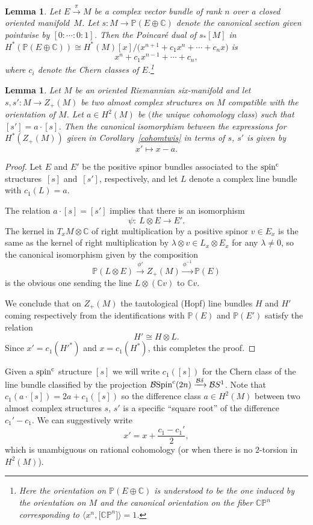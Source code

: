 \documentclass[10pt,a4paper]{amsart}
\newcommand{\CP}{\mathbb{CP}}
\newcommand{\C}{\mathbb{C}}
\numberwithin{equation}{section}
\newtheorem{Lemma}[Theorem]{Lemma}
\begin{document}
\begin{Lemma}\label{poincaredual}
Let $E \xrightarrow{\pi} M$ be a complex vector bundle of rank $n$ over a closed oriented mani\-fold~$M$. Let $s \colon M \to \mathbb{P}(E \oplus \C)$ denote the canonical section given pointwise by $[0: \cdots : 0 : 1]$.
Then the Poincar\'e dual of $s_*[M]$ in $H^*(\mathbb{P}(E\oplus \C)) \cong H^*(M)[x]/\big(x^{n+1} + c_1 x^n + \cdots + c_n x\big)$ is
\[
x^n + c_1x^{n-1} + \cdots + c_n,
\]
where $c_i$ denote the Chern classes of $E$.\footnote{Here the orientation on $\mathbb{P}(E\oplus \C)$ is understood to be the one induced by the orientation on $M$ and the canonical orientation on the fiber $\CP^n$ corresponding to $\langle x^n, \big[\CP^n\big] \rangle = 1$.}
\end{Lemma}

\begin{Lemma}
Let $M$ be an oriented Riemannian six-manifold and let $s,s'\colon M \to Z_+(M)$ be
two almost complex structures on $M$ compatible with the orientation of $M$.
Let $a \in H^2(M)$ be $($the unique cohomology class$)$ such that $[s']=a\cdot [s]$.
Then the canonical isomorphism between the expressions for $H^*(Z_+(M))$ given in Corollary~{\rm \ref{cohomtwis}} in terms of $s$, $s'$ is given by
\[
x' \mapsto x - a.
\]
\end{Lemma}
\begin{proof}
Let $E$ and $E'$ be the positive spinor bundles associated to the ${\rm spin}^{\rm c}$ structures~$[s]$ and~$[s']$, respectively, and let $L$ denote a complex line bundle with $c_1(L)=a$.

The relation $a \cdot [s]=[s']$ implies that there is an isomorphism
\[\psi \colon \ L \otimes E \to E'.\]
The kernel in $T_x M \otimes \C$ of right multiplication by a positive spinor
$v \in E_x$ is the same as the kernel of right multiplication by $\lambda \otimes v \in
L_x \otimes E_x$ for any $\lambda \neq 0$, so the canonical isomorphism given by the
composition
\[
\mathbb{P}(L\otimes E) \xrightarrow{\phi'} Z_+(M) \xrightarrow{\phi^{-1}} \mathbb{P}(E)
\]
is the obvious one sending the line $L \otimes (\C v)$ to $\C v$.

We conclude that on $Z_+(M)$ the tautological (Hopf) line bundles $H$ and $H'$ coming
respectively from the identifications with $\mathbb{P}(E)$ and $\mathbb{P}(E')$ satisfy
the relation
\[
H' \cong H \otimes L.
\]
Since $x'=c_1(H'^*)$ and $x=c_1(H^*)$, this completes the proof.
\end{proof}

Given a ${\rm spin}^{\rm c}$ structure $[s]$ we will write $c_1([s])$ for the Chern class of
the line bundle classified by the projection ${\mathcal B}{\rm Spin}^{\rm c}(2n) \xrightarrow{{\mathcal B}\delta} {\mathcal B}S ^1$.
Note that $c_1( a\cdot [s]) = 2a + c_1([s])$ so the difference class $a \in H^2(M)$
between two almost complex structures $s$, $s'$ is a specific ``square root'' of the
difference $c_1'-c_1$. We can suggestively write
\begin{equation}
\label{div2}
x' = x + \frac{c_1-c_1'}{2},
\end{equation}
which is unambiguous on rational cohomology (or when there is no $2$-torsion in $H^2(M)$).
\end{document}
